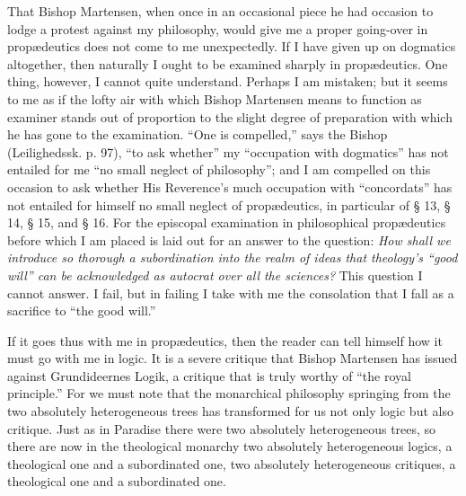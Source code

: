 \documentclass[12pt]{book}
\newcommand{\opage}[1]{\marginnote{\footnotesize\textit{[#1]}}}
\begin{document}
That Bishop Martensen, when once in an occasional piece he had occasion to lodge a protest against my philosophy, would give me a proper going-over in propædeutics does not come to me unexpectedly. If I have given up on dogmatics altogether, then naturally I ought to be examined sharply in propædeutics. One thing, however, I cannot quite understand. Perhaps I am mistaken;
\opage{113}\setcounter{footnote}{0}%
but it seems to me as if the lofty air with which Bishop Martensen means to function as examiner stands out of proportion to the slight degree of preparation with which he has gone to the examination. ``One is compelled,'' says the Bishop (Leilighedssk. p. 97), ``to ask whether'' my ``occupation with dogmatics'' has not entailed for me ``no small neglect of philosophy''; and I am compelled on this occasion to ask whether His Reverence's much occupation with ``concordats'' has not entailed for himself no small neglect of propædeutics, in particular of § 13, § 14, § 15, and § 16. For the episcopal examination in philosophical propædeutics before which I am placed is laid out for an answer to the question: \emph{How shall we introduce so thorough a subordination into the realm of ideas that theology's ``good will'' can be acknowledged as autocrat over all the sciences?} This question I cannot answer. I fail, but in failing I take with me the consolation that I fall as a sacrifice to ``the good will.''

If it goes thus with me in propædeutics, then the reader can tell himself how it must go with me in logic. It is a severe critique that Bishop Martensen has issued against Grundideernes Logik, a critique that is truly worthy of ``the royal principle.'' For we must note that the monarchical philosophy springing from the two absolutely heterogeneous trees has transformed for us not only logic but also critique. Just as in Paradise there were two absolutely heterogeneous trees, so there are now in the theological monarchy two absolutely heterogeneous logics, a theological one and a subordinated one, two absolutely heterogeneous critiques, a theological one and a subordinated one.
\end{document}
